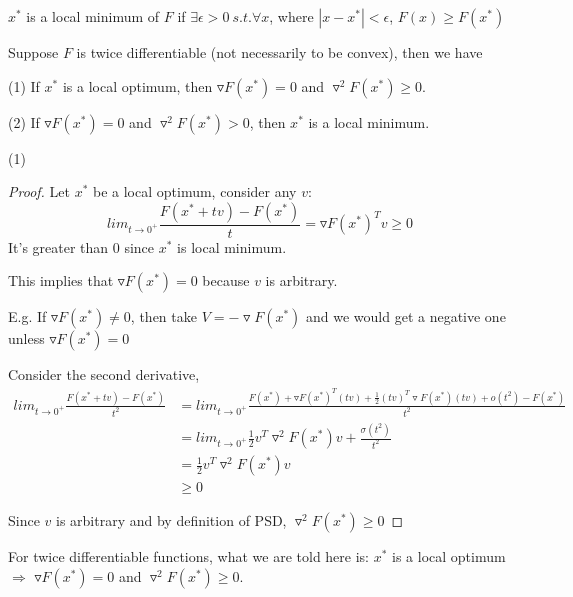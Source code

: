 \begin{definition}
	$x^*$ is a local minimum of $F$ if $\exists \epsilon >0\ s.t. \forall x$, where $|x - x^*| < \epsilon$, $F(x) \geq F(x^*)$
\end{definition}

\begin{theorem}
	Suppose $F$ is twice differentiable (not necessarily to be convex), then we have
	
	(1) If $x^*$ is a local optimum, then $\triangledown F(x^*) = 0$ and $\triangledown^2F(x^*)\geq 0$.
	
	(2) If $\triangledown F(x^*) = 0$ and $\triangledown^2F(x^*)> 0$, then $x^*$ is a local minimum. 
\end{theorem}

%

(1) 
\begin{proof}
	Let $x^*$ be a local optimum, consider any $v$:
	\begin{equation*}
	lim_{t\rightarrow 0^+}\frac{F(x^* + tv) - F(x^*)}{t} = \triangledown F(x^*)^Tv\geq 0
	\end{equation*}
	It's greater than $0$ since $x^*$ is local minimum.
	
	This implies that $\triangledown F(x^*) = 0$ because $v$ is arbitrary. 
	
	E.g. If $\triangledown F(x^*) \neq 0$, then take $V = -\triangledown F(x^*)$ and we would get a negative one unless $\triangledown F(x^*) = 0$
	
Consider the second derivative,
\begin{align*}
lim_{t\rightarrow 0^+}\frac{F(x^* + tv) - F(x^*)}{t^2} &= lim_{t\rightarrow 0^+} \frac{F(x^*) + \triangledown F(x^*)^T(tv) + \frac{1}{2}(tv)^T\triangledown F(x^*)(tv) + o(t^2) - F(x^*)}{t^2}\\
&= lim_{t\rightarrow 0^+} \frac{1}{2}v^T\triangledown^2F(x^*)v+\frac{\sigma(t^2)}{t^2}\\
&= \frac{1}{2}v^T\triangledown^2F(x^*)v \\
&\geq 0
\end{align*}

Since $v$ is arbitrary and by definition of PSD, $\triangledown^2 F(x^*) \geq 0$

\end{proof}
For twice differentiable functions, what we are told here is: $x^*$ is a local optimum $\Rightarrow$ $\triangledown F(x^*) = 0$ and $\triangledown^2F(x^*)\geq 0$.\\


